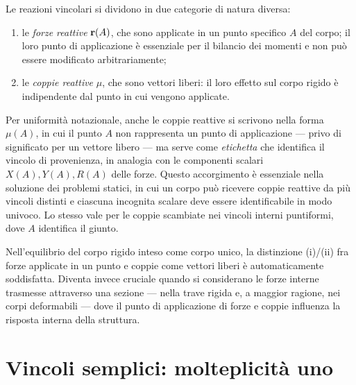 \begin{oss}
	Le reazioni vincolari si dividono in due categorie di
	natura diversa:
	\begin{enumerate}[label=(\roman*)]
		\item le \emph{forze reattive} $\mathbf{r}(A)$, che sono
		applicate in un punto specifico $A$ del corpo; il
		loro punto di applicazione è essenziale per il
		bilancio dei momenti e non può essere modificato
		arbitrariamente;
		\item le \emph{coppie reattive} $\mu$, che sono
		vettori liberi: il loro effetto sul corpo rigido
		è indipendente dal punto in cui vengono applicate.
	\end{enumerate}
	Per uniformità notazionale, anche le coppie reattive
	si scrivono nella forma $\mu(A)$, in cui il punto $A$
	non rappresenta un punto di applicazione --- privo di
	significato per un vettore libero --- ma serve come
	\emph{etichetta} che identifica il vincolo di
	provenienza, in analogia con le componenti scalari
	$X(A), Y(A), R(A)$ delle forze. Questo accorgimento
	è essenziale nella soluzione dei problemi statici, in
	cui un corpo può ricevere coppie reattive da più
	vincoli distinti e ciascuna incognita scalare deve
	essere identificabile in modo univoco. Lo stesso vale
	per le coppie scambiate nei vincoli interni puntiformi,
	dove $A$ identifica il giunto.
	
	Nell'equilibrio del corpo rigido inteso come corpo unico,
	la distinzione (i)/(ii) fra forze applicate in un punto e
	coppie come vettori liberi è automaticamente soddisfatta.
	Diventa invece cruciale quando si considerano le forze
	interne trasmesse attraverso una sezione --- nella trave
	rigida e, a maggior ragione, nei corpi deformabili ---
	dove il punto di applicazione di forze e coppie influenza
	la risposta interna della struttura.
\end{oss}


\section{Vincoli semplici: molteplicità uno}	\label{sec:semplici}

